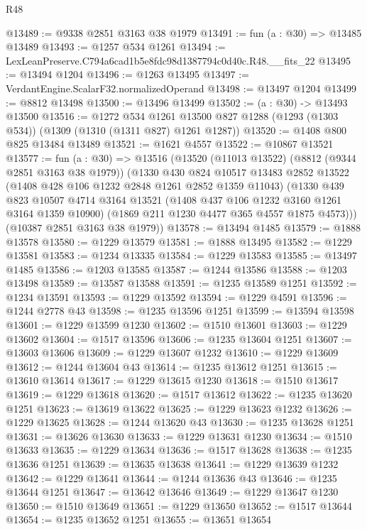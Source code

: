 \begin{lexlean}{R48}
\begin{coremodule}
@13489 := @9338 @2851 @3163 @38 @1979
@13491 := fun (a : @30) => @13485 @13489
@13493 := @1257 @534 @1261
@13494 := LexLeanPreserve.C794a6cad1b5e8fdc98d1387794c0d40c.R48.__fits_22
@13495 := @13494 @1204
@13496 := @1263 @13495
@13497 := VerdantEngine.ScalarF32.normalizedOperand
@13498 := @13497 @1204
@13499 := @8812 @13498
@13500 := @13496 @13499
@13502 := (a : @30) -> @13493 @13500
@13516 := @1272
    @534
    @1261
    @13500
    @827
    @1288
    (@1293 (@1303 @534))
    (@1309 (@1310 (@1311 @827) @1261 @1287))
@13520 := @1408 @800 @825 @13484 @13489
@13521 := @1621 @4557
@13522 := @10867 @13521
@13577 := fun (a : @30) =>
  @13516
    (@13520
      (@11013 @13522)
      (@8812 (@9344 @2851 @3163 @38 @1979))
      (@1330
        @430
        @824
        @10517
        @13483
        @2852
        @13522
        (@1408 @428 @106 @1232 @2848 @1261 @2852 @1359 @11043)
        (@1330
          @439
          @823
          @10507
          @4714
          @3164
          @13521
          (@1408 @437 @106 @1232 @3160 @1261 @3164 @1359 @10900)
          (@1869 @211 @1230 @4477 @365 @4557 @1875 @4573)))
      (@10387 @2851 @3163 @38 @1979))
@13578 := @13494 @1485
@13579 := @1888 @13578
@13580 := @1229 @13579
@13581 := @1888 @13495
@13582 := @1229 @13581
@13583 := @1234 @13335
@13584 := @1229 @13583
@13585 := @13497 @1485
@13586 := @1203 @13585
@13587 := @1244 @13586
@13588 := @1203 @13498
@13589 := @13587 @13588
@13591 := @1235 @13589 @1251
@13592 := @1234 @13591
@13593 := @1229 @13592
@13594 := @1229 @4591
@13596 := @1244 @2778 @43
@13598 := @1235 @13596 @1251
@13599 := @13594 @13598
@13601 := @1229 @13599 @1230
@13602 := @1510 @13601
@13603 := @1229 @13602
@13604 := @1517 @13596
@13606 := @1235 @13604 @1251
@13607 := @13603 @13606
@13609 := @1229 @13607 @1232
@13610 := @1229 @13609
@13612 := @1244 @13604 @43
@13614 := @1235 @13612 @1251
@13615 := @13610 @13614
@13617 := @1229 @13615 @1230
@13618 := @1510 @13617
@13619 := @1229 @13618
@13620 := @1517 @13612
@13622 := @1235 @13620 @1251
@13623 := @13619 @13622
@13625 := @1229 @13623 @1232
@13626 := @1229 @13625
@13628 := @1244 @13620 @43
@13630 := @1235 @13628 @1251
@13631 := @13626 @13630
@13633 := @1229 @13631 @1230
@13634 := @1510 @13633
@13635 := @1229 @13634
@13636 := @1517 @13628
@13638 := @1235 @13636 @1251
@13639 := @13635 @13638
@13641 := @1229 @13639 @1232
@13642 := @1229 @13641
@13644 := @1244 @13636 @43
@13646 := @1235 @13644 @1251
@13647 := @13642 @13646
@13649 := @1229 @13647 @1230
@13650 := @1510 @13649
@13651 := @1229 @13650
@13652 := @1517 @13644
@13654 := @1235 @13652 @1251
@13655 := @13651 @13654

\end{coremodule}
\end{lexlean}
